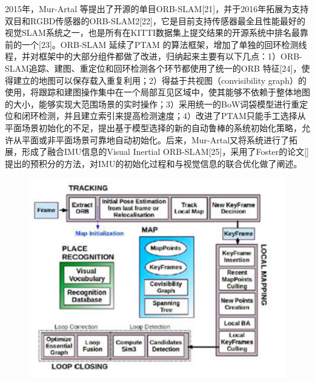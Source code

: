 2015年，Mur-Artal 等提出了开源的单目ORB-SLAM[21]，并于2016年拓展为支持双目和RGBD传感器的ORB-SLAM2[22]，它是目前支持传感器最全且性能最好的视觉SLAM系统之一，也是所有在KITTI数据集上提交结果的开源系统中排名最靠前的一个[23]。ORB-SLAM 延续了PTAM 的算法框架，增加了单独的回环检测线程，并对框架中的大部分组件都做了改进，归纳起来主要有以下几点：1）ORB-SLAM追踪、建图、重定位和回环检测各个环节都使用了统一的ORB 特征[24]，使得建立的地图可以保存载入重复利用；2）得益于共视图（convisibility graph）的使用，将跟踪和建图操作集中在一个局部互见区域中，使其能够不依赖于整体地图的大小，能够实现大范围场景的实时操作；3）采用统一的BoW词袋模型进行重定位和闭环检测，并且建立索引来提高检测速度；4）改进了PTAM只能手工选择从平面场景初始化的不足，提出基于模型选择的新的自动鲁棒的系统初始化策略，允许从平面或非平面场景可靠地自动初始化。后来，Mur-Artal又将系统进行了拓展，形成了融合IMU信息的Visual Inertial ORB-SLAM[25]，采用了Foster的论文[]提出的预积分的方法，对IMU的初始化过程和与视觉信息的联合优化做了阐述。
\begin{figure}[H]%
	\centering  %
	\includegraphics[width=0.7\linewidth]{image/Talk/13.png}  %

\end{figure}


